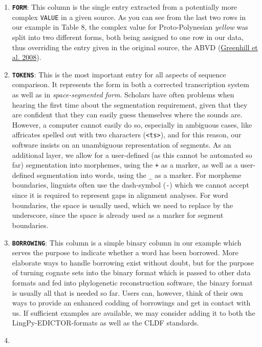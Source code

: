 \documentclass[a4paper,svgnames]{scrartcl}
\begin{document}
\begin{enumerate}
\item
  \textbf{\texttt{FORM}}: This column is the single entry extracted from
  a potentially more complex \texttt{VALUE} in a given source. As you
  can see from the last two rows in our example in Table 8, the complex
  value for Proto-Polynesian \emph{yellow} was split into two different
  forms, both being assigned to one row in our data, thus overriding the
  entry given in the original source, the ABVD
  (\href{http://bibliography.lingpy.org?key=Greenhill2008}{Greenhill et
  al. 2008}).
\item
  \textbf{\texttt{TOKENS}}: This is the most important entry for all
  aspects of sequence comparison. It represents the form in both a
  corrected transcription system as well as in \emph{space-segmented
  form}. Scholars have often problems when hearing the first time about
  the segmentation requirement, given that they are confident that they
  can easily guess themselves where the sounds are. However, a computer
  cannot easily do so, especially in ambiguous cases, like affricates
  spelled out with two characters
  (\texttt{\textless{}ts\textgreater{}}), and for this reason, our
  software insists on an unambiguous representation of segments. As an
  additional layer, we allow for a user-defined (as this cannot be
  automated so far) segmentation into morphemes, using the \texttt{+} as
  a marker, as well as a user-defined segmentation into words, using the
  \texttt{\_} as a marker. For morpheme boundaries, linguists often use
  the dash-symbol (\texttt{-}) which we cannot accept since it is
  required to represent gaps in alignment analyses. For word boundaries,
  the space is usually used, which we need to replace by the underscore,
  since the space is already used as a marker for segment boundaries.
\item
  \textbf{\texttt{BORROWING}}: This column is a simple binary column in
  our example which serves the purpose to indicate whether a word has
  been borrowed. More elaborate ways to handle borrowing exist without
  doubt, but for the purpose of turning cognate sets into the binary
  format which is passed to other data formats and fed into phylogenetic
  reconstruction software, the binary format is usually all that is
  needed so far. Users can, however, think of their own ways to provide
  an enhanced codding of borrowings and get in contact with us. If
  sufficient examples are available, we may consider adding it to both
  the LingPy-EDICTOR-formats as well as the CLDF standards.
\item

\end{enumerate}
\end{document}
